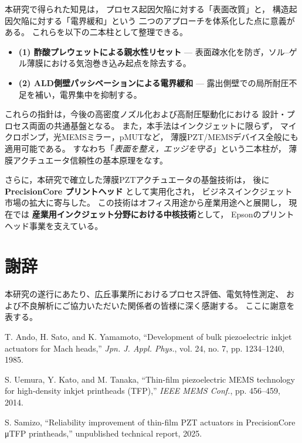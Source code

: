 \documentclass[conference]{IEEEtran}
\begin{document}
本研究で得られた知見は，
プロセス起因欠陥に対する「表面改質」と，
構造起因欠陥に対する「電界緩和」という
二つのアプローチを体系化した点に意義がある。
これらを以下の二本柱として整理できる。

\begin{itemize}
  \item \textbf{(1) 酢酸プレウェットによる親水性リセット} —  
  表面疎水化を防ぎ，ソル–ゲル薄膜における気泡巻き込み起点を除去する。
  \item \textbf{(2) ALD側壁パッシベーションによる電界緩和} —  
  露出側壁での局所耐圧不足を補い，電界集中を抑制する。
\end{itemize}

これらの指針は，今後の高密度ノズル化および高耐圧駆動化における
設計・プロセス両面の共通基盤となる。
また，本手法はインクジェットに限らず，
マイクロポンプ，光MEMSミラー，pMUTなど，
薄膜PZT/MEMSデバイス全般にも適用可能である。
すなわち「\emph{表面を整え，エッジを守る}」という二本柱が，
薄膜アクチュエータ信頼性の基本原理をなす。

\vspace{1em}
さらに，本研究で確立した薄膜PZTアクチュエータの基盤技術は，
後に \textbf{PrecisionCore プリントヘッド}\cite{Mach1985,Samizo2025} として実用化され，
ビジネスインクジェット市場の拡大に寄与した。
この技術はオフィス用途から産業用途へと展開し，
現在では \textbf{産業用インクジェット分野における中核技術}として，
Epsonのプリントヘッド事業を支えている。

\section*{謝辞}
本研究の遂行にあたり、広丘事業所におけるプロセス評価、電気特性測定、  
および不良解析にご協力いただいた関係者の皆様に深く感謝する。  
ここに謝意を表する。

\begin{thebibliography}{99}

T. Ando, H. Sato, and K. Yamamoto, 
``Development of bulk piezoelectric inkjet actuators for Mach heads,'' 
\textit{Jpn. J. Appl. Phys.}, vol. 24, no. 7, pp. 1234--1240, 1985.

S. Uemura, Y. Kato, and M. Tanaka, 
``Thin-film piezoelectric MEMS technology for high-density inkjet printheads (TFP),'' 
\textit{IEEE MEMS Conf.}, pp. 456--459, 2014.

S. Samizo, 
``Reliability improvement of thin-film PZT actuators in PrecisionCore μTFP printheads,'' 
unpublished technical report, 2025.

\end{thebibliography}
\end{document}
